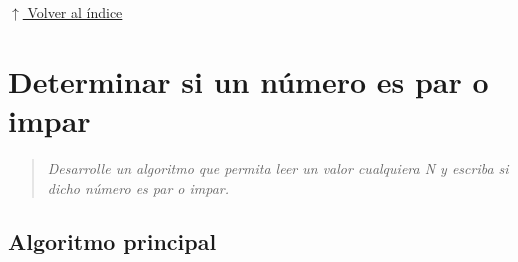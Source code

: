 \documentclass[12pt]{article}
\newcommand{\pseudocodigo}[2]{%
}
\newcommand{\volverindice}{%
    \vspace{1em}%
    \begin{flushright}%
        \hyperlink{indice}{\small $\uparrow$ Volver al índice}%
    \end{flushright}%
}
\newcommand{\enunciado}[1]{%
    \begin{quote}
        \itshape #1
    \end{quote}
}
\begin{document}



\volverindice
\newpage


\section{Determinar si un número es par o impar}

\enunciado{Desarrolle un algoritmo que permita leer un valor cualquiera N y escriba si dicho número es par o impar.}

\subsection{Algoritmo principal}

\pseudocodigo{ej06_par_impar}{Par o impar}






\end{document}
